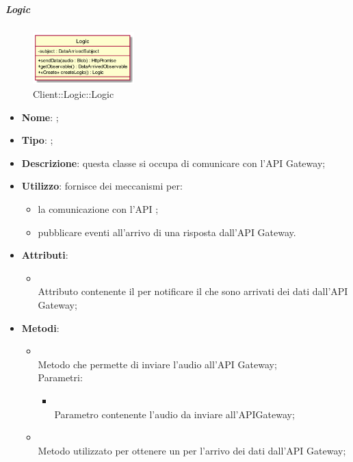\hypertarget{Logic_label}{\subparagraph{Logic}}
\begin{figure}[h]
	\centering
	\includegraphics[width=0.35\textwidth,height=\textheight,keepaspectratio]{images/ClassLogic.png}
	\caption{Client::Logic::Logic}
\end{figure}
\begin{itemize}
	\item \textbf{Nome}: ;
	\item \textbf{Tipo}: ;
	\item \textbf{Descrizione}: questa classe si occupa di comunicare con l'API Gateway;
	\item \textbf{Utilizzo}: fornisce dei meccanismi per:
\begin{itemize}
\item la comunicazione con l'API ;
\item pubblicare eventi all'arrivo di una risposta dall'API Gateway.
\end{itemize}
	\item \textbf{Attributi}:
	\begin{itemize}
		\item[]  \\
		Attributo contenente il  per notificare il  che sono arrivati dei dati dall'API Gateway;
	\end{itemize}
	\item \textbf{Metodi}:
	\begin{itemize}
		\item[]  \\		Metodo che permette di inviare l'audio all'API Gateway;\\
		Parametri:
		\begin{itemize}
			\item {} \\
			Parametro contenente l'audio da inviare all'APIGateway;
		\end{itemize}
		\item[]  \\		Metodo utilizzato per ottenere un  per l'arrivo dei dati dall'API Gateway;\\

\end{itemize}
\end{itemize}

